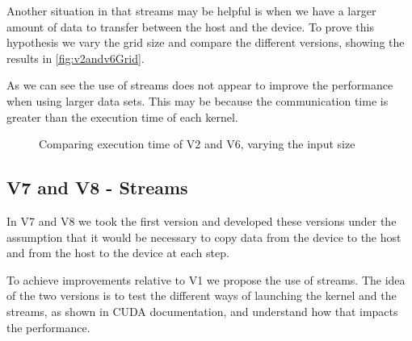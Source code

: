 \documentclass[conference]{IEEEtran}
\begin{document}
Another situation in that streams may be helpful is when we have a larger amount of data to transfer between the host and the device. To prove this hypothesis we vary the grid size and compare the different versions, showing the results in \autoref{fig:v2andv6Grid}.

As we can see the use of streams does not appear to improve the performance when using larger data sets. This may be because the communication time is greater than the execution time of each kernel.


\begin{figure}[ht]
  \centering
  \caption{Comparing execution time of V2 and V6, varying the input size}
  \label{fig:v2andv6Grid}
\end{figure}

\subsection{V7 and V8 - Streams}

In V7 and V8 we took the first version and developed these versions under the assumption that it would be necessary to copy data from the device to the host and from the host to the device at each step.

To achieve improvements relative to V1 we propose the use of streams. The idea of the two versions is to test the different ways of launching the kernel and the streams, as shown in CUDA documentation\cite{HowOverlapData2012}, and understand how that impacts the performance.
\end{document}
